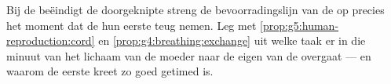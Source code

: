 \begin{exercise}[$\star\star\star$]\label{exo:g5:human-reproduction:11}
Bij de  beëindigt de doorgeknipte streng de bevoorradingslijn
van de  op precies het moment dat de  hun eerste teug nemen.
Leg met \cref{prop:g5:human-reproduction:cord} en
\cref{prop:g4:breathing:exchange} uit welke taak er in die minuut van
het lichaam van de moeder naar de eigen  van de  overgaat ---
en waarom de eerste kreet zo goed getimed is.
\end{exercise}
